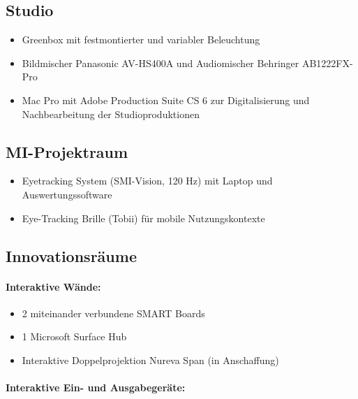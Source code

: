 \subsection{Studio}\label{studio}

\begin{itemize}
\tightlist
\item
  Greenbox mit festmontierter und variabler Beleuchtung
\item
  Bildmischer Panasonic AV-HS400A und Audiomischer Behringer
  AB1222FX-Pro
\item
  Mac Pro mit Adobe Production Suite CS 6 zur Digitalisierung und
  Nachbearbeitung der Studioproduktionen
\end{itemize}

\subsection{MI-Projektraum}\label{mi-projektraum}

\begin{itemize}
\tightlist
\item
  Eyetracking System (SMI-Vision, 120 Hz) mit Laptop und
  Auswertungssoftware
\item
  Eye-Tracking Brille (Tobii) für mobile Nutzungskontexte
\end{itemize}

\subsection{Innovationsräume}\label{innovationsruxe4ume}

\paragraph{Interaktive Wände:}\label{interaktive-wuxe4nde}

\begin{itemize}
\tightlist
\item
  2 miteinander verbundene SMART Boards
\item
  1 Microsoft Surface Hub
\item
  Interaktive Doppelprojektion Nureva Span (in Anschaffung)
\end{itemize}

\paragraph{Interaktive Ein- und
Ausgabegeräte:}\label{interaktive-ein--und-ausgabegeruxe4te}

